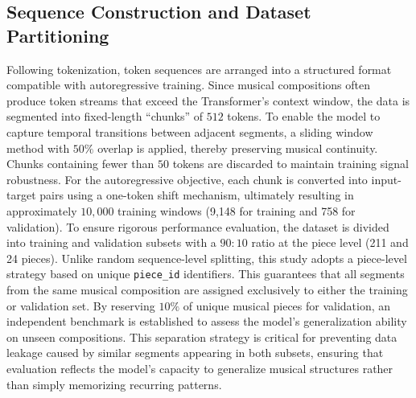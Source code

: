 \documentclass[conference,a4paper]{IEEEtran}
\begin{document}
\subsection{Sequence Construction and Dataset Partitioning}
Following tokenization, token sequences are arranged into a structured format compatible with autoregressive training. Since musical compositions often produce token streams that exceed the Transformer's context window, the data is segmented into fixed-length ``chunks'' of 
$512$ tokens. To enable the model to capture temporal transitions between adjacent segments, a sliding window method with  $50\%$ overlap is applied, thereby preserving musical continuity. Chunks containing fewer than $50$ tokens are discarded to maintain training signal robustness. For the autoregressive objective, each chunk is converted into input-target pairs using a one-token shift mechanism, ultimately resulting in approximately 
$10{,}000$ training windows (9,148 for training and 758 for validation).
To ensure rigorous performance evaluation, the dataset is divided into training and validation subsets with a $90:10$ ratio at the piece level (211 and 24 pieces). Unlike random sequence-level splitting, this study adopts a piece-level strategy based on unique \texttt{piece\_id} identifiers. This guarantees that all segments from the same musical composition are assigned exclusively to either the training or validation set. By reserving $10\%$ of unique musical pieces for validation, an independent benchmark is established to assess the model’s generalization ability on unseen compositions. This separation strategy is critical for preventing data leakage caused by similar segments appearing in both subsets, ensuring that evaluation reflects the model’s capacity to generalize musical structures rather than simply memorizing recurring patterns.
\end{document}
